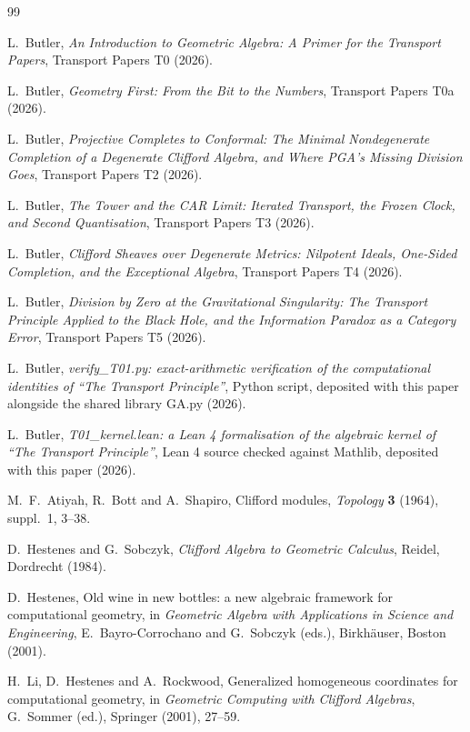 \begin{thebibliography}{99}

L.~Butler,
\emph{An Introduction to Geometric Algebra: A Primer for the Transport Papers},
Transport Papers T0 (2026).

L.~Butler,
\emph{Geometry First: From the Bit to the Numbers},
Transport Papers T0a (2026).

L.~Butler,
\emph{Projective Completes to Conformal: The Minimal Nondegenerate Completion of a Degenerate Clifford Algebra, and Where PGA's Missing Division Goes},
Transport Papers T2 (2026).

L.~Butler,
\emph{The Tower and the CAR Limit: Iterated Transport, the Frozen Clock, and Second Quantisation},
Transport Papers T3 (2026).

L.~Butler,
\emph{Clifford Sheaves over Degenerate Metrics: Nilpotent Ideals, One-Sided Completion, and the Exceptional Algebra},
Transport Papers T4 (2026).

L.~Butler,
\emph{Division by Zero at the Gravitational Singularity: The Transport Principle Applied to the Black Hole, and the Information Paradox as a Category Error},
Transport Papers T5 (2026).

L.~Butler,
\emph{verify\_T01.py: exact-arithmetic verification of the computational identities of ``The Transport Principle''},
Python script, deposited with this paper alongside the shared library GA.py (2026).

L.~Butler,
\emph{T01\_kernel.lean: a Lean 4 formalisation of the algebraic kernel of ``The Transport Principle''},
Lean 4 source checked against Mathlib, deposited with this paper (2026).

M.~F.~Atiyah, R.~Bott and A.~Shapiro,
Clifford modules,
\emph{Topology} \textbf{3} (1964), suppl.~1, 3--38.

D.~Hestenes and G.~Sobczyk,
\emph{Clifford Algebra to Geometric Calculus},
Reidel, Dordrecht (1984).

D.~Hestenes,
Old wine in new bottles: a new algebraic framework for computational geometry,
in \emph{Geometric Algebra with Applications in Science and Engineering},
E.~Bayro-Corrochano and G.~Sobczyk (eds.), Birkh\"auser, Boston (2001).

H.~Li, D.~Hestenes and A.~Rockwood,
Generalized homogeneous coordinates for computational geometry,
in \emph{Geometric Computing with Clifford Algebras},
G.~Sommer (ed.), Springer (2001), 27--59.


\end{thebibliography}
